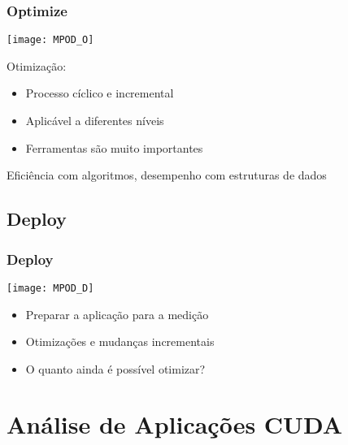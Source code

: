 \documentclass[10pt, compress, aspectratio=43, xcolor={table,usenames,dvipsnames}]{beamer}
\begin{document}
\begin{frame}
    \frametitle{Optimize}
    \begin{center}
    \texttt{[image: MPOD\_O]}
    \end{center}

    \vfill

    Otimização:
    \begin{itemize}
        \item Processo \alert{cíclico} e \alert{incremental}
        \item Aplicável a \alert{diferentes níveis}
        \item \alert{Ferramentas} são muito importantes
    \end{itemize}

    \begin{center}
    \alert{Eficiência com algoritmos}, \alert{desempenho com estruturas de dados}
    \end{center}
\end{frame}

\subsection{Deploy}

\begin{frame}
    \frametitle{Deploy}
    \begin{center}
    \texttt{[image: MPOD\_D]}
    \end{center}

    \vfill

    \begin{itemize}
        \item Preparar a aplicação para a \alert{medição}
        \item Otimizações e mudanças \alert{incrementais}
        \item O quanto ainda é \alert{possível} otimizar?
    \end{itemize}
\end{frame}

\section{Análise de Aplicações CUDA}
\end{document}
